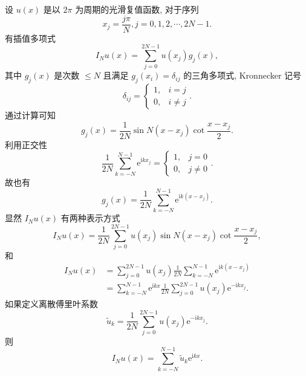 设 $u(x)$ 是以 $2 \pi$ 为周期的光滑复值函数, 对于序列
\begin{equation}
x_j=\frac{j \pi}{N}, j=0,1,2, \cdots, 2 N-1.
\end{equation}
有插值多项式
\begin{equation}
I_N u(x)=\sum_{j=0}^{2 N-1} u\left(x_j\right) g_j(x),\label{eq:FT1}
\end{equation}
其中 $g_j(x)$ 是次数 $\leq N$ 且满足 $g_j\left(x_i\right)=\delta_{i j}$ 的三角多项式, 
Kronnecker 记号
\begin{equation}
\delta_{i j}= \begin{cases}1, & i=j \\ 0, & i \neq j\end{cases}
.\end{equation}
通过计算可知
\begin{equation}
g_j(x)=\frac{1}{2 N} \sin N\left(x-x_j\right) \cot \frac{x-x_j}{2}.
\end{equation}
利用正交性
\begin{equation}
\frac{1}{2 N} \sum_{k=-N}^{N-1} \mathrm{e}^{\mathrm{i} k x_j}= \begin{cases}1, & j=0 \\ 0, & j \neq 0\end{cases}.
\end{equation}
故也有
\begin{equation}
g_j(x)=\frac{1}{2 N} \sum_{k=-N}^{N-1} \mathrm{e}^{\mathrm{i} k\left(x-x_j\right)}.
\end{equation}
显然 $I_N u(x)$ 有两种表示方式
\begin{equation}
I_N u(x)=\frac{1}{2 N} \sum_{j=0}^{2 N-1} u\left(x_j\right) \sin N\left(x-x_j\right) \cot \frac{x-x_j}{2},
\end{equation}
和
\begin{equation}
\begin{aligned}
I_N u(x)&=\sum_{j=0}^{2 N-1} u\left(x_j\right) \frac{1}{2 N} \sum_{k=-N}^{N-1} \mathrm{e}^{\mathrm{i} k\left(x-x_j\right)} \\
&=\sum_{k=-N}^{N-1} \mathrm{e}^{\mathrm{i} k x} \frac{1}{2 N} \sum_{j=0}^{2 N-1} u\left(x_j\right) \mathrm{e}^{-\mathrm{i} k x_j}.
\end{aligned}
\end{equation}
如果定义离散傅里叶系数
\begin{equation}
\tilde{u}_k=\frac{1}{2 N} \sum_{j=0}^{2 N-1} u\left(x_j\right) \mathrm{e}^{-\mathrm{i} k x_j}.
\end{equation}
则
\begin{equation}
I_N u(x)=\sum_{k=-N}^{N-1} \tilde{u}_k \mathrm{e}^{\mathrm{i} k x}.
\end{equation}

